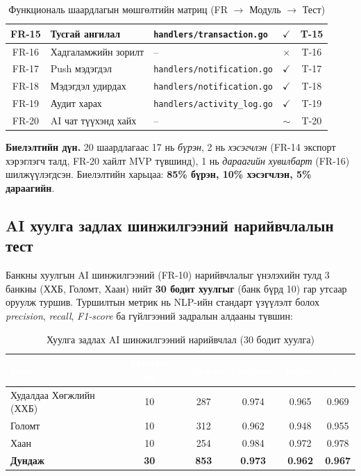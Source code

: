 \begin{table}[ht]
\begin{tabular}{|c|p{4.5cm}|p{3.8cm}|c|c|}
FR-15 & Тусгай ангилал                  & \texttt{handlers/transaction.go}    & $\checkmark$ & T-15 \\ \hline
FR-16 & Хадгаламжийн зорилт             & --                                  & $\times$     & T-16 \\ \hline
FR-17 & Push мэдэгдэл                   & \texttt{handlers/notification.go}   & $\checkmark$ & T-17 \\ \hline
FR-18 & Мэдэгдэл удирдах                & \texttt{handlers/notification.go}   & $\checkmark$ & T-18 \\ \hline
FR-19 & Аудит харах                     & \texttt{handlers/activity\_log.go}  & $\checkmark$ & T-19 \\ \hline
FR-20 & AI чат түүхэнд хайх             & --                                  & $\sim$       & T-20 \\ \hline
\end{tabular}
\caption{Функциональ шаардлагын мөшгөлтийн матриц (FR $\rightarrow$ Модуль $\rightarrow$ Тест)}
\label{tab:fr-trace}
\end{table}

\textbf{Биелэлтийн дүн.} 20 шаардлагаас 17 нь \emph{бүрэн}, 2 нь \emph{хэсэгчлэн} (FR-14 экспорт хэрэглэгч талд, FR-20 хайлт MVP түвшинд), 1 нь \emph{дараагийн хувилбарт} (FR-16) шилжүүлэгдсэн. Биелэлтийн харьцаа: \textbf{85\% бүрэн, 10\% хэсэгчлэн, 5\% дараагийн}.

\subsection{AI хуулга задлах шинжилгээний нарийвчлалын тест}
Банкны хуулгын AI шинжилгээний (FR-10) нарийвчлалыг үнэлэхийн тулд 3 банкны (ХХБ, Голомт, Хаан) нийт \textbf{30 бодит хуулгыг} (банк бүрд 10) гар утсаар оруулж туршив. Туршилтын метрик нь NLP-ийн стандарт үзүүлэлт болох \emph{precision}, \emph{recall}, \emph{F1-score} ба гүйлгээний задралын алдааны түвшин:

\begin{table}[ht]
\centering
\footnotesize
\renewcommand{\arraystretch}{1.25}
\begin{tabular}{|p{3cm}|c|c|c|c|c|}
\hline
\rowcolor{darknavy}
\textcolor{white}{\textbf{Банк}} &
\textcolor{white}{\textbf{Хуулгын тоо}} &
\textcolor{white}{\textbf{Гүйлгээ}} &
\textcolor{white}{\textbf{Precision}} &
\textcolor{white}{\textbf{Recall}} &
\textcolor{white}{\textbf{F1}} \\ \hline
Худалдаа Хөгжлийн (ХХБ) & 10 & 287 & 0.974 & 0.965 & 0.969 \\ \hline
Голомт                  & 10 & 312 & 0.962 & 0.948 & 0.955 \\ \hline
Хаан                    & 10 & 254 & 0.984 & 0.972 & 0.978 \\ \hline
\rowcolor{accentgreen!30}
\textbf{Дундаж}         & \textbf{30} & \textbf{853} & \textbf{0.973} & \textbf{0.962} & \textbf{0.967} \\ \hline
\end{tabular}
\caption{Хуулга задлах AI шинжилгээний нарийвчлал (30 бодит хуулга)}
\label{tab:ai-accuracy}
\end{table}

